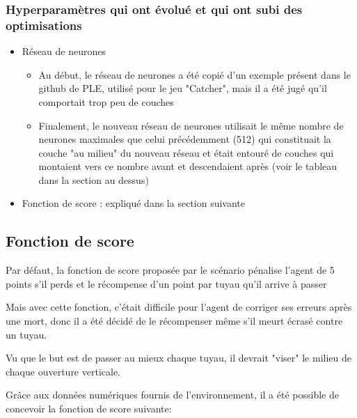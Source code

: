 \documentclass[a4paper,10pt,openany,oneside]{report}
\begin{document}
\subsubsection*{Hyperparamètres qui ont évolué et qui ont subi des optimisations}
\begin{itemize}
	\item Réseau de neurones
	\begin{itemize}
	\item Au début, le réseau de neurones a été copié d'un exemple présent dans le github de PLE, utilisé pour le jeu "Catcher", mais il a été jugé qu'il comportait trop peu de couches
	\item Finalement, le nouveau réseau de neurones utilisait le même nombre de neurones maximales que celui précédemment (512) qui constituait la couche "au milieu" du nouveau réseau et était entouré de couches qui montaient vers ce nombre avant et descendaient après (voir le tableau dans la section au dessus)
	\end{itemize}
	\item Fonction de score : expliqué dans la section suivante
\end{itemize}
\subsection{Fonction de score}
Par défaut, la fonction de score proposée par le scénario pénalise l'agent de 5 points s'il perds et le récompense d'un point par tuyau qu'il arrive à passer

Mais avec cette fonction, c'était difficile pour l'agent de corriger ses erreurs après une mort, donc il a été décidé de le récompenser même s'il meurt écrasé contre un tuyau.

Vu que le but est de passer au mieux chaque tuyau, il devrait "viser" le milieu de chaque ouverture verticale.

Grâce aux données numériques fournis de l'environnement, il a été possible de concevoir la fonction de score suivante:
\end{document}
